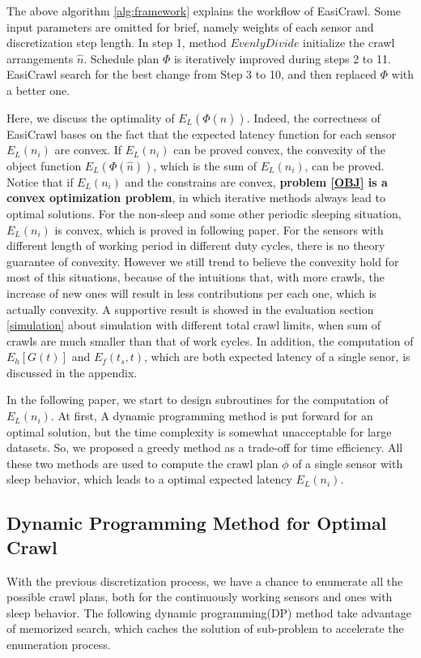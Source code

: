 \documentclass[conference]{IEEEtran}
\begin{document}
The above algorithm \ref{alg:framework} explains the workflow of EasiCrawl. 
Some input parameters are omitted for brief, namely weights of each sensor and discretization step length.
In step 1, method $EvenlyDivide$ initialize the crawl arrangements $\hat{n}$. 
Schedule plan $\Phi$ is iteratively improved during steps 2 to 11. 
EasiCrawl search for the best change from Step 3 to 10, and then replaced $\Phi$ with a better one.

Here, we discuss the optimality of $E_L(\Phi(\hat{n}))$.
Indeed, the correctness of EasiCrawl bases on the fact that the expected latency function for each sensor $E_L(n_i)$ are convex. 
If $E_L(n_i)$ can be proved convex, the convexity of the object function $E_L(\Phi(\hat{n}))$, which is the sum of $E_L(n_i)$, can be proved.
Notice that if $E_L(n_i)$ and the constrains are convex, \textbf{problem \eqref{OBJ} is a convex optimization problem}, in which iterative methods always lead to optimal solutions.
For the non-sleep and some other periodic sleeping situation, $E_L(n_i)$ is convex, which is proved in following paper.
For the sensors with different length of working period in different duty cycles, there is no theory guarantee of convexity.
However we still trend to believe the convexity hold for most of this situations, because of the intuitions that, with more crawls, the increase of new ones will result in less contributions per each one, which is actually convexity.
A supportive result is showed in the evaluation section \ref{simulation} about simulation with different total crawl limits, when sum of crawls are much smaller than that of work cycles.
In addition, the computation of $E_h[G(t)]$ and $E_f(t_s,t)$, which are both expected latency of a single senor, is discussed in the appendix.

In the following paper, we start to design subroutines for the computation of $E_L(n_i)$.
At first, A dynamic programming method is put forward for an optimal solution,  but the time complexity is somewhat unacceptable for large datasets.
So, we proposed a greedy method as a trade-off for time efficiency. 
All these two methods are used to compute the crawl plan $\phi$ of a single sensor with sleep behavior, which leads to a optimal expected latency $E_L(n_i)$.

\subsection{Dynamic Programming Method for Optimal Crawl}

With the previous discretization process, we have a chance to enumerate all the possible crawl plans, both for the continuously working sensors and ones with sleep behavior. 
The following dynamic programming(DP) method take advantage of memorized search, which caches the solution of sub-problem to accelerate the enumeration process.
\end{document}
